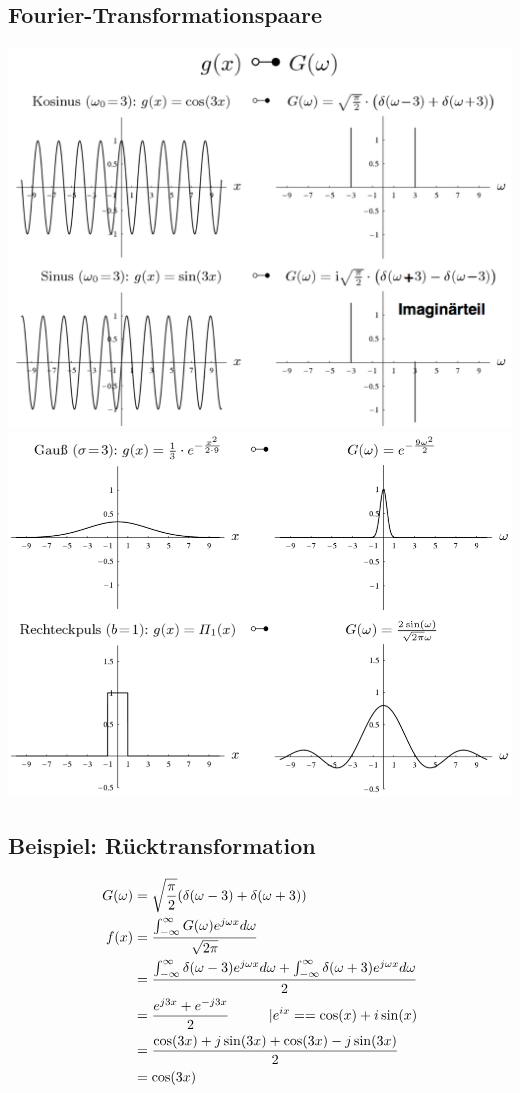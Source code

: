 \documentclass[10pt]{article}
\begin{document}
\subsection{Fourier-Transformationspaare}
\begin{center}
	\includegraphics[scale=0.225]{ft-paar-1.png}
	\hspace{0.5cm}
	\includegraphics[scale=0.225]{ft-paar-2.png}
\end{center}
\subsection{Beispiel: Rücktransformation}
\begin{align*}
  G(\omega) &= \sqrt{\frac{\pi}{2}}(\delta(\omega-3)+\delta(\omega+3)) \\
  f(x) &= \frac{\int_{-\infty}^\infty G(\omega)e^{j\omega x}d\omega}{\sqrt{2\pi}} \\
  &= \frac{\int_{-\infty}^\infty \delta(\omega-3)e^{j\omega x}d\omega + \int_{-\infty}^\infty \delta(\omega+3)e^{j\omega x}d\omega}{2} \\
  &= \frac{e^{j3x}+e^{-j3x}}{2} \hspace*{1cm}| e^{ix} == \cos(x)+i\sin(x)\\
  &= \frac{\cos(3x)+j\sin(3x)+\cos(3x)-j\sin(3x)}{2} \\
  &= \cos(3x)
\end{align*}
\end{document}
